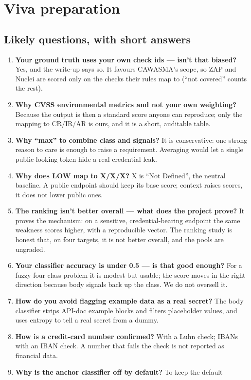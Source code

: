 \section{Viva preparation}
\subsection{Likely questions, with short answers}
\begin{enumerate}[leftmargin=*,itemsep=3pt]
\item \textbf{Your ground truth uses your own check ids --- isn't that biased?}
Yes, and the write-up says so. It favours CAWASMA's scope, so ZAP and Nuclei are
scored only on the checks their rules map to (``not covered'' counts the rest).
\item \textbf{Why CVSS environmental metrics and not your own weighting?} Because
the output is then a standard score anyone can reproduce; only the mapping to
CR/IR/AR is ours, and it is a short, auditable table.
\item \textbf{Why ``max'' to combine class and signals?} It is conservative: one
strong reason to care is enough to raise a requirement. Averaging would let a
single public-looking token hide a real credential leak.
\item \textbf{Why does LOW map to X/X/X?} X is ``Not Defined'', the neutral
baseline. A public endpoint should keep its base score; context raises scores, it
does not lower public ones.
\item \textbf{The ranking isn't better overall --- what does the project prove?}
It proves the mechanism: on a sensitive, credential-bearing endpoint the same
weakness scores higher, with a reproducible vector. The ranking study is honest
that, on four targets, it is not better overall, and the pools are ungraded.
\item \textbf{Your classifier accuracy is under 0.5 --- is that good enough?}
For a fuzzy four-class problem it is modest but usable; the score moves in the
right direction because body signals back up the class. We do not oversell it.
\item \textbf{How do you avoid flagging example data as a real secret?} The body
classifier strips API-doc example blocks and filters placeholder values, and uses
entropy to tell a real secret from a dummy.
\item \textbf{How is a credit-card number confirmed?} With a Luhn check; IBANs
with an IBAN check. A number that fails the check is not reported as financial
data.
\item \textbf{Why is the anchor classifier off by default?} To keep the default

\end{enumerate}
